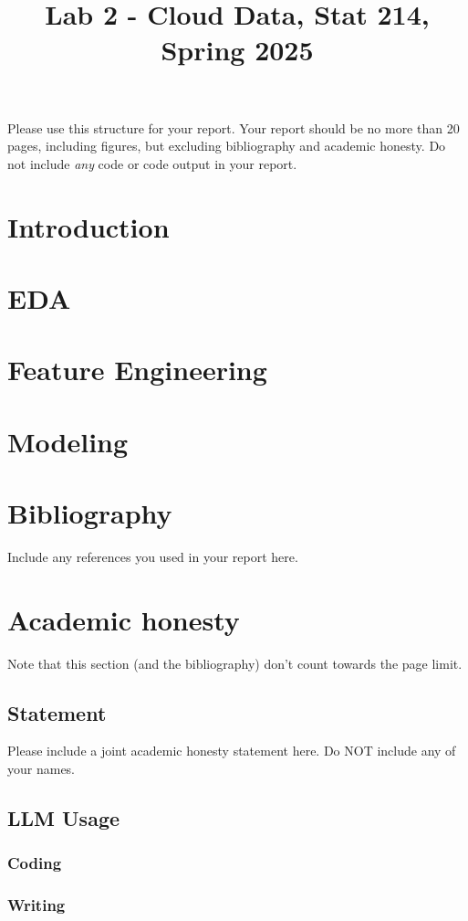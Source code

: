 \documentclass[10pt,letterpaper]{article}
\title{Lab 2 - Cloud Data, Stat 214, Spring 2025\vspace{-2em}}
\begin{document}
\maketitle

Please use this structure for your report. Your report should be no more than 20 pages, including figures, but excluding bibliography and academic honesty. Do not include \emph{any} code or code output in your report. 

\section{Introduction}

\section{EDA}

\section{Feature Engineering}

\section{Modeling}

\section{Bibliography}
Include any references you used in your report here.
\appendix
\section{Academic honesty}
Note that this section (and the bibliography) don't count towards the page limit.
\subsection{Statement}
Please include a joint academic honesty statement here. Do NOT include any of your names.
\subsection{LLM Usage}


\subsubsection*{Coding}

\subsubsection*{Writing}
\end{document}
